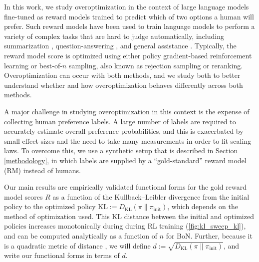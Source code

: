 \documentclass{article}
\theoremstyle{plain}
\begin{document}
In this work, we study overoptimization in the context of large language models fine-tuned as reward models trained to predict which of two options a human will prefer. Such reward models have been used to train language models to perform a variety of complex tasks that are hard to judge automatically, including summarization \citep{summarization}, question-answering \citep{webgpt, gophercite}, and general assistance \citep{instructgpt, anthropicrlhf1,glaese2022improving}. Typically, the reward model score is optimized using either policy gradient-based reinforcement learning or best-of-$n$ sampling, also known as rejection sampling or reranking. Overoptimization can occur with both methods, and we study both to better understand whether and how overoptimization behaves differently across both methods. 


A major challenge in studying overoptimization in this context is the expense of collecting human preference labels. A large number of labels are required to accurately estimate overall preference probabilities, and this is exacerbated by small effect sizes and the need to take many measurements in order to fit scaling laws. To overcome this, we use a synthetic setup that is described in Section \ref{methodology}, in which labels are supplied by a ``gold-standard'' reward model (RM) instead of humans.
























Our main results are empirically validated functional forms for the gold reward model scores $R$ as a function of the Kullback--Leibler divergence from the initial policy to the optimized policy $\text{KL} := D_{\text{KL}}\left(\pi\parallel\pi_{\text{init}}\right)$, which depends on the method of optimization used. This KL distance between the initial and optimized policies increases monotonically during during RL training (\cref{fig:kl_sweep_kl}), and can be computed analytically as a function of $n$ for BoN. Further, because it is a quadratic metric of distance \citep[Section 4.3]{anthropicrlhf1}, we will define $d := \sqrt{D_{\text{KL}}\left(\pi\parallel\pi_{\text{init}}\right)}$, and write our functional forms in terms of $d$. 
\end{document}
